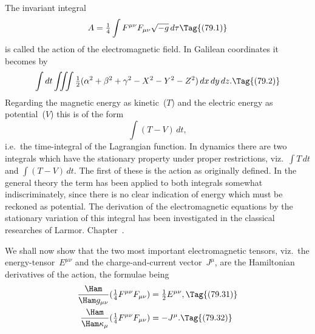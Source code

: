 \documentclass[12pt]{book}
\begin{document}
%
%
%

The invariant integral
\[
A = \tfrac{1}{4} \int F^{\mu\nu} F_{\mu\nu} \sqrt{-g}\, d\tau
\Tag{(79.1)}
\]
is called the action of the electromagnetic field. In Galilean coordinates it
becomes by~
\[
\int dt \iiint \tfrac{1}{2}(\alpha^2 + \beta^2 + \gamma^2 - X^{2} - Y^{2} - Z^{2})\, dx\, dy\, dz.
\Tag{(79.2)}
\]
Regarding the magnetic energy as kinetic~($T$) and the electric energy as
potential~($V$) this is of the form
\[
\int (T - V)\, dt,
\]
i.e.\ the time\hyp{}integral of the Lagrangian function\footnotemark.\footnotetext
  {In dynamics there are two integrals which have the stationary property under proper restrictions,
  viz.\ $\int T\, dt$ and $\int (T - V)\, dt$. The first of these is the action as originally defined. In the
  general theory the term has been applied to both integrals somewhat indiscriminately, since there
  is no clear indication of energy which must be reckoned as potential.}
The derivation of the
electromagnetic equations by the stationary variation of this integral has been
investigated in the classical researches of Larmor\footnotemark.\footnotetext
  { Chapter~.}

We shall now show that the two most important electromagnetic tensors,
viz.\ the energy\hyp{}tensor~$E^{\mu\nu}$ and the charge\hyp{}and\hyp{}current vector~$J^{\mu}$, are the
Hamiltonian derivatives of the action, the formulae being
\begin{align*}
  \frac{\Ham}{\Ham g_{\mu\nu}} (\tfrac{1}{4}F^{\mu\nu} F_{\mu\nu})
  &= \tfrac{1}{2} E^{\mu\nu},
  \Tag{(79.31)} \\
  \frac{\Ham}{\Ham \kappa_{\mu}} (\tfrac{1}{4}F^{\mu\nu} F_{\mu\nu})
  &= -J^{\mu}.
  \Tag{(79.32)}
\end{align*}
\end{document}
